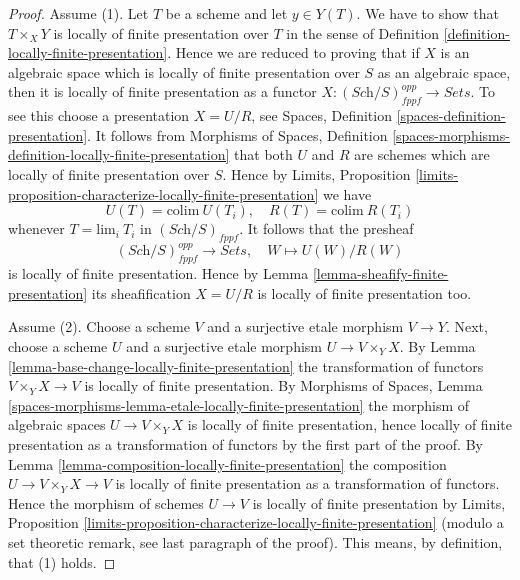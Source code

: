 \begin{proof}
Assume (1). Let $T$ be a scheme and let $y \in Y(T)$. We have to show that
$T \times_X Y$ is locally of finite presentation over $T$ in the sense of
Definition \ref{definition-locally-finite-presentation}.
Hence we are reduced to proving that if $X$ is an algebraic space which
is locally of finite presentation over $S$ as an algebraic space, then it
is locally of finite presentation as a functor
$X : (\textit{Sch}/S)_{fppf}^{opp} \to \textit{Sets}$.
To see this choose a presentation $X = U/R$, see
Spaces, Definition \ref{spaces-definition-presentation}.
It follows from
Morphisms of Spaces,
Definition \ref{spaces-morphisms-definition-locally-finite-presentation}
that both $U$ and $R$ are schemes which are locally of finite presentation
over $S$. Hence by
Limits, Proposition
\ref{limits-proposition-characterize-locally-finite-presentation}
we have
$$
U(T) = \text{colim}\ U(T_i),\quad
R(T) = \text{colim}\ R(T_i)
$$
whenever $T = \text{lim}_i\ T_i$ in $(\textit{Sch}/S)_{fppf}$. It follows
that the presheaf
$$
(\textit{Sch}/S)_{fppf}^{opp} \longrightarrow \textit{Sets},\quad
W \longmapsto U(W)/R(W)
$$
is locally of finite presentation. Hence by
Lemma \ref{lemma-sheafify-finite-presentation}
its sheafification $X = U/R$ is locally of finite presentation too.

\medskip\noindent
Assume (2). Choose a scheme $V$ and a surjective etale morphism
$V \to Y$. Next, choose a scheme $U$ and a surjective etale morphism
$U \to V \times_Y X$. By
Lemma \ref{lemma-base-change-locally-finite-presentation}
the transformation of functors $V \times_Y X \to V$ is locally of
finite presentation. By
Morphisms of Spaces,
Lemma \ref{spaces-morphisms-lemma-etale-locally-finite-presentation}
the morphism of algebraic spaces $U \to V \times_Y X$ is locally
of finite presentation, hence locally of finite presentation as
a transformation of functors by the first part of the proof. By
Lemma \ref{lemma-composition-locally-finite-presentation}
the composition $U \to V \times_Y X \to V$ is locally of
finite presentation as a transformation of functors. Hence
the morphism of schemes $U \to V$ is locally of finite presentation by
Limits, Proposition
\ref{limits-proposition-characterize-locally-finite-presentation}
(modulo a set theoretic remark, see last paragraph of the proof).
This means, by definition, that (1) holds.


\end{proof}
